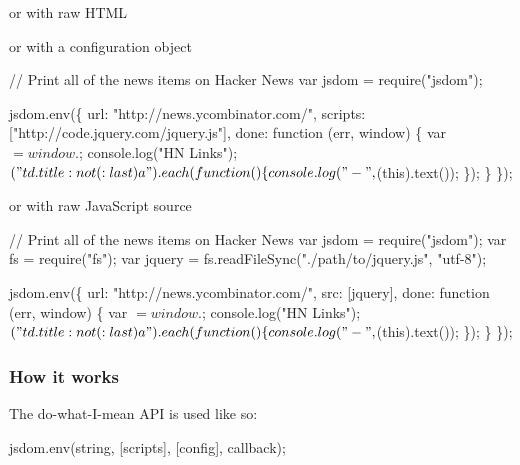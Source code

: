or with raw H\+T\+ML




or with a configuration object


\begin{DoxyCode}
// Print all of the news items on Hacker News
var jsdom = require("jsdom");

jsdom.env(\{
  url: "http://news.ycombinator.com/",
  scripts: ["http://code.jquery.com/jquery.js"],
  done: function (err, window) \{
    var $ = window.$;
    console.log("HN Links");
    $("td.title:not(:last) a").each(function() \{
      console.log(" -", $(this).text());
    \});
  \}
\});
\end{DoxyCode}


or with raw Java\+Script source


\begin{DoxyCode}
// Print all of the news items on Hacker News
var jsdom = require("jsdom");
var fs = require("fs");
var jquery = fs.readFileSync("./path/to/jquery.js", "utf-8");

jsdom.env(\{
  url: "http://news.ycombinator.com/",
  src: [jquery],
  done: function (err, window) \{
    var $ = window.$;
    console.log("HN Links");
    $("td.title:not(:last) a").each(function () \{
      console.log(" -", $(this).text());
    \});
  \}
\});
\end{DoxyCode}


\subsubsection*{How it works}

The do-\/what-\/\+I-\/mean A\+PI is used like so\+:


\begin{DoxyCode}
jsdom.env(string, [scripts], [config], callback);
\end{DoxyCode}



